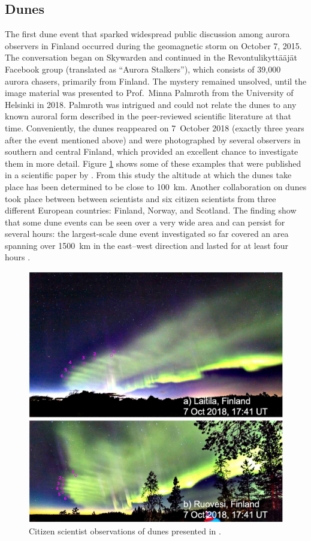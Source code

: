 \documentclass{article}
\renewcommand{\cite}[1]{\parencite{#1}}
\newcommand{\contributed}[1]{%
    \par\noindent
    \begingroup
    \setlength{\leftskip}{1em}%
    \itshape
    Contributors: #1
    \par
    \endgroup
    \vspace{0.5em}
}
\begin{document}
\subsection{Dunes}\label{dunes}  
The first dune event that sparked widespread public discussion among aurora observers in Finland occurred during the geomagnetic storm on October 7, 2015. The conversation began on Skywarden and continued in the Revontulikyttääjät Facebook group (translated as ``Aurora Stalkers''), which consists of 39,000 aurora chasers, primarily from Finland. The mystery remained unsolved, until the image material was presented to Prof.~Minna Palmroth from the University of Helsinki in 2018. Palmroth was intrigued and could not relate the dunes to any known auroral form described in the peer-reviewed scientific literature at that time. Conveniently, the dunes reappeared on 7~October 2018 (exactly three years after the event mentioned above) and were photographed by several observers in southern and central Finland, which provided an excellent chance to investigate them in more detail. Figure \ref{duneexample} shows some of these examples that were published in a scientific paper by \textcite{Palmroth2020}. From this study the altitude at which the dunes take place has been determined to be close to 100~km. Another collaboration on dunes took place between between scientists and six citizen scientists from three different European countries: Finland, Norway, and Scotland. The finding \cite{Grandin2021} show that some dune events can be seen over a very wide area and can persist for several hours: the largest-scale dune event investigated so far covered an area spanning over 1500~km in the east--west direction and lasted for at least four hours \cite{Grandin2021}.
\begin{figure}[h!]
  \includegraphics[width=0.9\linewidth]{Fig7_dunes.jpg}
  \caption{Citizen scientist observations of dunes presented in \textcite{Palmroth2020}.}
  \label{duneexample}
\end{figure}
\end{document}
